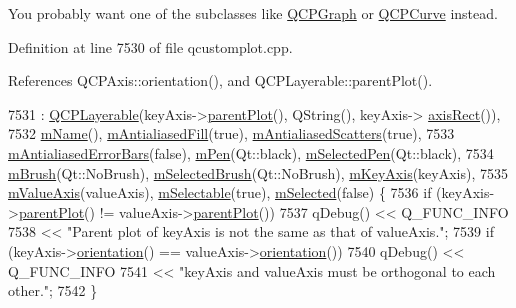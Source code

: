 You probably want one of the subclasses like \hyperlink{class_q_c_p_graph}{Q\+C\+P\+Graph} or \hyperlink{class_q_c_p_curve}{Q\+C\+P\+Curve} instead. 

Definition at line 7530 of file qcustomplot.\+cpp.



References Q\+C\+P\+Axis\+::orientation(), and Q\+C\+P\+Layerable\+::parent\+Plot().


\begin{DoxyCode}
7531     : \hyperlink{class_q_c_p_layerable_a74c0fa237f29bf0e49565013fc5d1ec0}{QCPLayerable}(keyAxis->\hyperlink{class_q_c_p_layerable_ab7e0e94461566093d36ffc0f5312b109}{parentPlot}(), QString(), keyAxis->
      \hyperlink{class_q_c_p_axis_aada3102af43b029e3879bcbf2bddfabb}{axisRect}()),
7532       \hyperlink{class_q_c_p_abstract_plottable_ac29ffef424e2488675930de18cde612a}{mName}(), \hyperlink{class_q_c_p_abstract_plottable_a152ac765bedf927fb240545d11d453ea}{mAntialiasedFill}(\textcolor{keyword}{true}), \hyperlink{class_q_c_p_abstract_plottable_aa115755e525a8e3a86dc683f9cab755b}{mAntialiasedScatters}(\textcolor{keyword}{true}),
7533       \hyperlink{class_q_c_p_abstract_plottable_ad48660b2bd301576e92fb033d8f455ea}{mAntialiasedErrorBars}(\textcolor{keyword}{false}), \hyperlink{class_q_c_p_abstract_plottable_a67bc0622fd1b9fa14e54c14922dcec66}{mPen}(Qt::black), 
      \hyperlink{class_q_c_p_abstract_plottable_a10619472f5d5e10e9519a599f1cf5576}{mSelectedPen}(Qt::black),
7534       \hyperlink{class_q_c_p_abstract_plottable_a33f00674c0161c13315ab9da0895418e}{mBrush}(Qt::NoBrush), \hyperlink{class_q_c_p_abstract_plottable_aea3c0da30c7a8be23ad5f2d9bca36762}{mSelectedBrush}(Qt::NoBrush), 
      \hyperlink{class_q_c_p_abstract_plottable_a426f42e254d0f8ce5436a868c61a6827}{mKeyAxis}(keyAxis),
7535       \hyperlink{class_q_c_p_abstract_plottable_a2901452ca4aea911a1827717934a4bda}{mValueAxis}(valueAxis), \hyperlink{class_q_c_p_abstract_plottable_aceee52342c8e75727abcbd164986fdcb}{mSelectable}(\textcolor{keyword}{true}), \hyperlink{class_q_c_p_abstract_plottable_a43f68a0603e9bcd016bdfa6d9d5c41c9}{mSelected}(\textcolor{keyword}{false}) \{
7536   \textcolor{keywordflow}{if} (keyAxis->\hyperlink{class_q_c_p_layerable_ab7e0e94461566093d36ffc0f5312b109}{parentPlot}() != valueAxis->\hyperlink{class_q_c_p_layerable_ab7e0e94461566093d36ffc0f5312b109}{parentPlot}())
7537     qDebug() << Q\_FUNC\_INFO
7538              << \textcolor{stringliteral}{"Parent plot of keyAxis is not the same as that of valueAxis."};
7539   \textcolor{keywordflow}{if} (keyAxis->\hyperlink{class_q_c_p_axis_a57483f2f60145ddc9e63f3af53959265}{orientation}() == valueAxis->\hyperlink{class_q_c_p_axis_a57483f2f60145ddc9e63f3af53959265}{orientation}())
7540     qDebug() << Q\_FUNC\_INFO
7541              << \textcolor{stringliteral}{"keyAxis and valueAxis must be orthogonal to each other."};
7542 \}
\end{DoxyCode}


